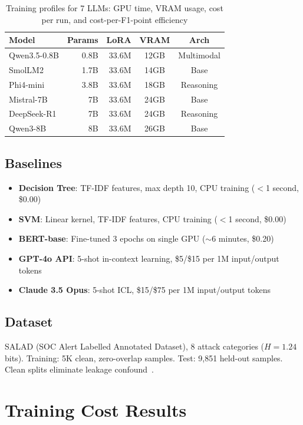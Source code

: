 \documentclass[review,3p]{elsarticle}
\begin{document}
\begin{table}[!ht]
\centering
\caption{Training profiles for 7 LLMs: GPU time, VRAM usage, cost per run, and cost-per-F1-point efficiency}
\label{tab:profiles}
\begin{tabular}{lrrcc}
\toprule
\textbf{Model} & \textbf{Params} & \textbf{LoRA} & \textbf{VRAM} & \textbf{Arch} \\
\midrule
Qwen3.5-0.8B & 0.8B & 33.6M & 12GB & Multimodal \\
SmolLM2 & 1.7B & 33.6M & 14GB & Base \\
Phi4-mini & 3.8B & 33.6M & 18GB & Reasoning \\
Mistral-7B & 7B & 33.6M & 24GB & Base \\
DeepSeek-R1 & 7B & 33.6M & 24GB & Reasoning \\
Qwen3-8B & 8B & 33.6M & 26GB & Base \\
\bottomrule
\end{tabular}
\end{table}

\subsection{Baselines}
\begin{itemize}
\item \textbf{Decision Tree}: TF-IDF features, max depth 10, CPU training ($<$1 second, \$0.00)
\item \textbf{SVM}: Linear kernel, TF-IDF features, CPU training ($<$1 second, \$0.00)
\item \textbf{BERT-base}: Fine-tuned 3 epochs on single GPU ($\sim$6 minutes, \$0.20)
\item \textbf{GPT-4o API}: 5-shot in-context learning, \$5/\$15 per 1M input/output tokens
\item \textbf{Claude 3.5 Opus}: 5-shot ICL, \$15/\$75 per 1M input/output tokens
\end{itemize}

\subsection{Dataset}
SALAD (SOC Alert Labelled Annotated Dataset), 8 attack categories ($H=1.24$ bits). Training: 5K clean, zero-overlap samples. Test: 9,851 held-out samples. Clean splits eliminate leakage confound~\cite{p22}.

\section{Training Cost Results}
\end{document}
